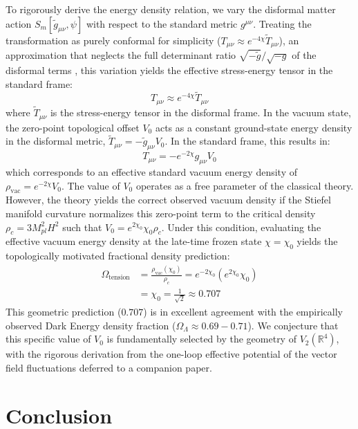 \documentclass[twocolumn,amsmath,amssymb,floatfix]{article}
\newcommand{\tmunu}{\tilde{g}_{\mu\nu}}
\begin{document}
To rigorously derive the energy density relation, we vary the disformal matter action $S_m[\tmunu, \psi]$ with respect to the standard metric $g^{\mu\nu}$. Treating the transformation as purely conformal for simplicity ($T_{\mu\nu} \approx e^{-4\chi} \tilde{T}_{\mu\nu}$), an approximation that neglects the full determinant ratio $\sqrt{-\tilde{g}}/\sqrt{-g}$ of the disformal terms \citep{Zumalacarregui2014}, this variation yields the effective stress-energy tensor in the standard frame:
\begin{equation}
    T_{\mu\nu} \approx e^{-4\chi} \tilde{T}_{\mu\nu}
\end{equation}
where $\tilde{T}_{\mu\nu}$ is the stress-energy tensor in the disformal frame. In the vacuum state, the zero-point topological offset $V_0$ acts as a constant ground-state energy density in the disformal metric, $\tilde{T}_{\mu\nu} = -\tilde{g}_{\mu\nu} V_0$. In the standard frame, this results in:
\begin{equation}
    T_{\mu\nu} = -e^{-2\chi} g_{\mu\nu} V_0
\end{equation}
which corresponds to an effective standard vacuum energy density of $\rho_{\text{vac}} = e^{-2\chi} V_0$. The value of $V_0$ operates as a free parameter of the classical theory. However, the theory yields the correct observed vacuum density if the Stiefel manifold curvature normalizes this zero-point term to the critical density $\rho_c = 3 M_{pl}^2 H^2$ such that $V_0 = e^{2\chi_0} \chi_0 \rho_c$. Under this condition, evaluating the effective vacuum energy density at the late-time frozen state $\chi = \chi_0$ yields the topologically motivated fractional density prediction:
\begin{align}
    \Omega_{\text{tension}} &= \frac{\rho_{\text{vac}}(\chi_0)}{\rho_c} = e^{-2\chi_0} \left(e^{2\chi_0} \chi_0 \right) \nonumber \\
    &= \chi_0 = \frac{1}{\sqrt{2}} \approx 0.707
\end{align}
This geometric prediction ($0.707$) is in excellent agreement with the empirically observed Dark Energy density fraction ($\Omega_\Lambda \approx 0.69 - 0.71$). We conjecture that this specific value of $V_0$ is fundamentally selected by the geometry of $V_2(\mathbb{R}^4)$, with the rigorous derivation from the one-loop effective potential of the vector field fluctuations deferred to a companion paper.

\section{Conclusion}
\end{document}
